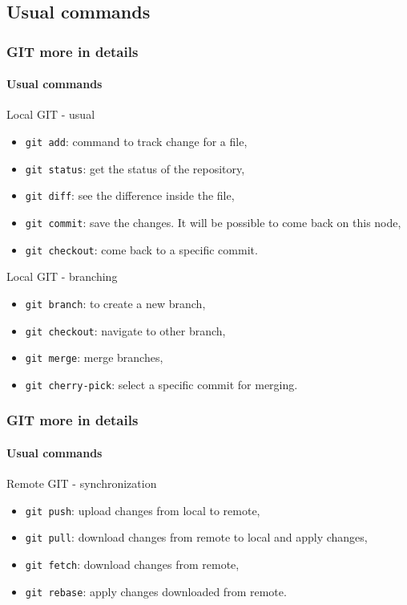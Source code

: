 \documentclass{beamer}
\begin{document}
\subsection{Usual commands}

\begin{frame}
  \frametitle{GIT more in details}
  \framesubtitle{Usual commands}
  \begin{block}{Local GIT - usual}\footnotesize
    \begin{itemize}
    \item \texttt{git add}: command to track change for a file,
    \item \texttt{git status}: get the status of the repository,
    \item \texttt{git diff}: see the difference inside the file,
    \item \texttt{git commit}: save the changes. It will be possible to come back on this node,
    \item \texttt{git checkout}: come back to a specific commit. 
    \end{itemize}
  \end{block}
  \begin{block}{Local GIT - branching}\footnotesize
    \begin{itemize}
    \item \texttt{git branch}: to create a new branch,
    \item \texttt{git checkout}: navigate to other branch,
    \item \texttt{git merge}: merge branches,
    \item \texttt{git cherry-pick}: select a specific commit for merging.
    \end{itemize}
  \end{block}
\end{frame}

\begin{frame}
  \frametitle{GIT more in details}
  \framesubtitle{Usual commands}
  \begin{block}{Remote GIT - synchronization}\footnotesize
    \begin{itemize}
    \item \texttt{git push}: upload changes from local to remote,
    \item \texttt{git pull}: download changes from remote to local and apply changes,
    \item \texttt{git fetch}: download changes from remote,
    \item \texttt{git rebase}: apply changes downloaded from remote.
    \end{itemize}
  \end{block}
\end{frame}
\end{document}

